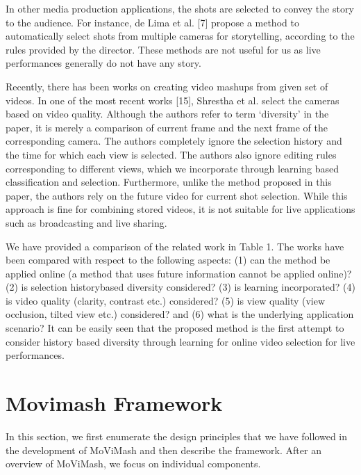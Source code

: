 \documentclass{sig-alternate}
\begin{document}
In other media production applications, the shots are selected to
convey the story to the audience. For instance, de Lima et al. [7] propose a method to automatically select shots from multiple cameras
for storytelling, according to the rules provided by the director.
These methods are not useful for us as live performances generally
do not have any story.

Recently, there has been works on creating video mashups from
given set of videos. In one of the most recent works [15], Shrestha
et al. select the cameras based on video quality. Although the authors
refer to term ‘diversity’ in the paper, it is merely a comparison
of current frame and the next frame of the corresponding camera.
The authors completely ignore the selection history and the
time for which each view is selected. The authors also ignore editing
rules corresponding to different views, which we incorporate
through learning based classification and selection. Furthermore,
unlike the method proposed in this paper, the authors rely on the
future video for current shot selection. While this approach is fine
for combining stored videos, it is not suitable for live applications
such as broadcasting and live sharing.

We have provided a comparison of the related work in Table 1.
The works have been compared with respect to the following aspects:
(1) can the method be applied online (a method that uses future
information cannot be applied online)? (2) is selection historybased
diversity considered? (3) is learning incorporated? (4) is
video quality (clarity, contrast etc.) considered? (5) is view quality
(view occlusion, tilted view etc.) considered? and (6) what is the
underlying application scenario? It can be easily seen that the proposed
method is the first attempt to consider history based diversity
through learning for online video selection for live performances.

\section{Movimash Framework}
In this section, we first enumerate the design principles that we
have followed in the development of MoViMash and then describe
the framework. After an overview of MoViMash, we focus on individual
components.
\end{document}
